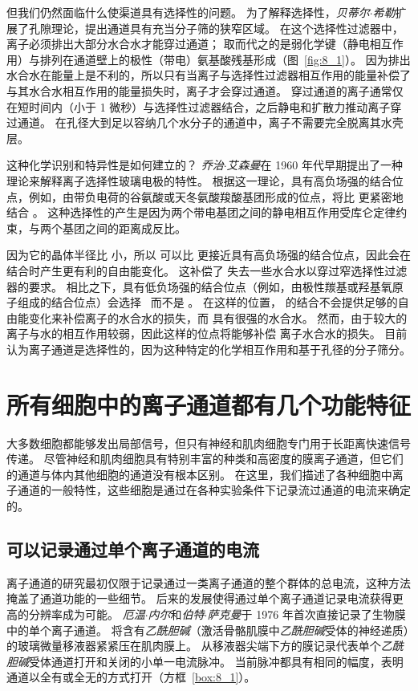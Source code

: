 但我们仍然面临什么使渠道具有选择性的问题。
为了解释选择性，\textit{贝蒂尔$\cdot$希勒}扩展了孔隙理论，提出通道具有充当分子筛的狭窄区域。
在这个选择性过滤器中，离子必须排出大部分水合水才能穿过通道；
取而代之的是弱化学键（静电相互作用）与排列在通道壁上的极性（带电）氨基酸残基形成（图~\ref{fig:8_1}）。
因为排出水合水在能量上是不利的，所以只有当离子与选择性过滤器相互作用的能量补偿了与其水合水相互作用的能量损失时，离子才会穿过通道。
穿过通道的离子通常仅在短时间内（小于 1 微秒）与选择性过滤器结合，之后静电和扩散力推动离子穿过通道。
在孔径大到足以容纳几个水分子的通道中，离子不需要完全脱离其水壳层。


这种化学识别和特异性是如何建立的？
\textit{乔治$\cdot$艾森曼}在 1960 年代早期提出了一种理论来解释离子选择性玻璃电极的特性。
根据这一理论，具有高负场强的结合位点，例如，由带负电荷的谷氨酸或天冬氨酸羧酸基团形成的位点，将比  更紧密地结合 。
这种选择性的产生是因为两个带电基团之间的静电相互作用受库仑定律约束，与两个基团之间的距离成反比。


因为它的晶体半径比  小，所以  可以比  更接近具有高负场强的结合位点，因此会在结合时产生更有利的自由能变化。
这补偿了  失去一些水合水以穿过窄选择性过滤器的要求。
相比之下，具有低负场强的结合位点（例如，由极性羰基或羟基氧原子组成的结合位点）会选择~ 而不是 。
在这样的位置， 的结合不会提供足够的自由能变化来补偿离子的水合水的损失，而  具有很强的水合水。
然而，由于较大的  离子与水的相互作用较弱，因此这样的位点将能够补偿  离子水合水的损失。
目前认为离子通道是选择性的，因为这种特定的化学相互作用和基于孔径的分子筛分。



\section{所有细胞中的离子通道都有几个功能特征}

大多数细胞都能够发出局部信号，但只有神经和肌肉细胞专门用于长距离快速信号传递。
尽管神经和肌肉细胞具有特别丰富的种类和高密度的膜离子通道，但它们的通道与体内其他细胞的通道没有根本区别。
在这里，我们描述了各种细胞中离子通道的一般特性，这些细胞是通过在各种实验条件下记录流过通道的电流来确定的。



\subsection{可以记录通过单个离子通道的电流}

离子通道的研究最初仅限于记录通过一类离子通道的整个群体的总电流，这种方法掩盖了通道功能的一些细节。
后来的发展使得通过单个离子通道记录电流获得更高的分辨率成为可能。
\textit{厄温$\cdot$内尔}和\textit{伯特$\cdot$萨克曼}于 1976 年首次直接记录了生物膜中的单个离子通道。
将含有\textit{乙酰胆碱}（激活骨骼肌膜中\textit{乙酰胆碱}受体的神经递质）的玻璃微量移液器紧紧压在肌肉膜上。
从移液器尖端下方的膜记录代表单个\textit{乙酰胆碱}受体通道打开和关闭的小单一电流脉冲。
当前脉冲都具有相同的幅度，表明通道以全有或全无的方式打开（方框~\ref{box:8_1}）。



